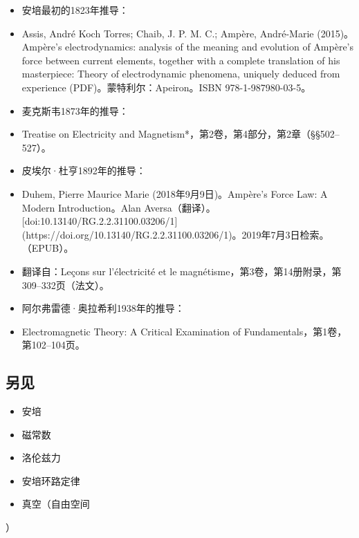 \begin{itemize}
\item 安培最初的1823年推导：
\item Assis, André Koch Torres; Chaib, J. P. M. C.; Ampère, André-Marie (2015)。Ampère's electrodynamics: analysis of the meaning and evolution of Ampère's force between current elements, together with a complete translation of his masterpiece: Theory of electrodynamic phenomena, uniquely deduced from experience (PDF)。蒙特利尔：Apeiron。ISBN 978-1-987980-03-5。
\item 麦克斯韦1873年的推导：
\item Treatise on Electricity and Magnetism*，第2卷，第4部分，第2章（§§502–527）。
\item 皮埃尔·杜亨1892年的推导：
\item Duhem, Pierre Maurice Marie (2018年9月9日)。Ampère's Force Law: A Modern Introduction。Alan Aversa（翻译）。[doi:10.13140/RG.2.2.31100.03206/1](https://doi.org/10.13140/RG.2.2.31100.03206/1)。2019年7月3日检索。（EPUB）。
\item 翻译自：Leçons sur l’électricité et le magnétisme，第3卷，第14册附录，第309–332页（法文）。
\item 阿尔弗雷德·奥拉希利1938年的推导：
\item Electromagnetic Theory: A Critical Examination of Fundamentals，第1卷，第102–104页。
\end{itemize}
\subsection{另见}
\begin{itemize}
\item 安培  
\item 磁常数  
\item 洛伦兹力  
\item 安培环路定律  
\item 真空（自由空间
\end{itemize}）
